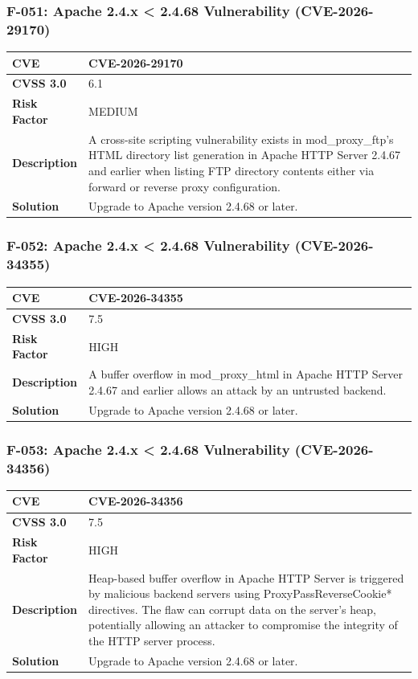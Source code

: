 \subsubsection{F-051: Apache 2.4.x < 2.4.68 Vulnerability (CVE-2026-29170)}
\begin{tabular}{|p{2.8cm}|p{12.2cm}|}
\hline
\textbf{CVE} & CVE-2026-29170 \\ \hline
\textbf{CVSS 3.0} & 6.1 \\ \hline
\textbf{Risk Factor} & MEDIUM \\ \hline
\textbf{Description} & A cross-site scripting vulnerability exists in mod\_proxy\_ftp's HTML directory list generation in Apache HTTP Server 2.4.67 and earlier when listing FTP directory contents either via forward or reverse proxy configuration. \\ \hline
\textbf{Solution} & Upgrade to Apache version 2.4.68 or later. \\ \hline
\end{tabular}

\subsubsection{F-052: Apache 2.4.x < 2.4.68 Vulnerability (CVE-2026-34355)}
\begin{tabular}{|p{2.8cm}|p{12.2cm}|}
\hline
\textbf{CVE} & CVE-2026-34355 \\ \hline
\textbf{CVSS 3.0} & 7.5 \\ \hline
\textbf{Risk Factor} & HIGH \\ \hline
\textbf{Description} & A buffer overflow in mod\_proxy\_html in Apache HTTP Server 2.4.67 and earlier allows an attack by an untrusted backend. \\ \hline
\textbf{Solution} & Upgrade to Apache version 2.4.68 or later. \\ \hline
\end{tabular}

\subsubsection{F-053: Apache 2.4.x < 2.4.68 Vulnerability (CVE-2026-34356)}
\begin{tabular}{|p{2.8cm}|p{12.2cm}|}
\hline
\textbf{CVE} & CVE-2026-34356 \\ \hline
\textbf{CVSS 3.0} & 7.5 \\ \hline
\textbf{Risk Factor} & HIGH \\ \hline
\textbf{Description} & Heap-based buffer overflow in Apache HTTP Server is triggered by malicious backend servers using ProxyPassReverseCookie* directives. The flaw can corrupt data on the server’s heap, potentially allowing an attacker to compromise the integrity of the HTTP server process. \\ \hline
\textbf{Solution} & Upgrade to Apache version 2.4.68 or later. \\ \hline
\end{tabular}

